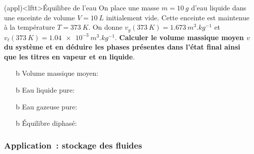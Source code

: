 \documentclass[../../main/main.tex]{subfiles}
\begin{document}
\begin{tcb*}(appl)<lftt>{Équilibre de l'eau}
	On place une masse $m = \SI{10}{g}$ d'eau liquide dans une enceinte de volume
	$V = \SI{10}{L}$ initialement vide. Cette enceinte est maintenue à la
	température $T = \SI{373}{K}$. On donne $v_g(\SI{373}{K}) =
		\SI{1.673}{m^3.kg^{-1}}$ et $v_{\ell}(\SI{373}{K}) =
		\SI{1.04e-3}{m^3.kg^{-1}}$.
	\smallbreak
	\textbf{Calculer le volume massique moyen $v$ du système et en déduire les
		phases présentes dans l'état final ainsi que les titres en vapeur et en
		liquide}.
	\tcblower
	\begin{itemize}
		\item[b]{Volume massique moyen}:
		\vspace{-25pt}
		\vspace{-15pt}
		\item[b]{Eau liquide pure}:
		\vspace{-25pt}
		\vspace{-15pt}
		\item[b]{Eau gazeuse pure}:
		\vspace{-25pt}
		\vspace{-15pt}
		\item[b]{Équilibre diphasé}:
		\vspace{-25pt}
	\end{itemize}
	\vspace{-25pt}
\end{tcb*}

\subsubsection{Application~: stockage des fluides}
\end{document}
